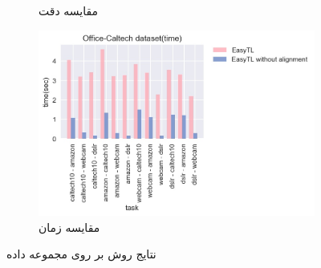 \begin{figure}[H]
\begin{subfigure}[b]{0.3\textwidth}
		\caption{مقایسه دقت}
	\end{subfigure}%
	\begin{subfigure}[b]{0.3\textwidth}
		\centering
		\includegraphics[width=\linewidth]{images/3_3.jpg}
		\caption{مقایسه زمان}
	\end{subfigure}%
	\caption{
		نتایج روش
		بر روی مجموعه داده
		\textit{}
	}
	\label{fig:3}
\end{figure}

